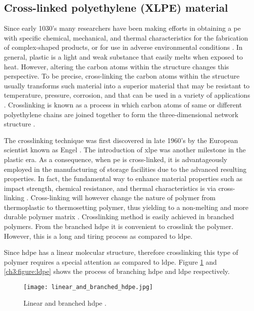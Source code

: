 \subsection{Cross-linked polyethylene (XLPE) material}

Since early 1030's many researchers have been making efforts in obtaining a \acrshort{pe} with specific chemical, mechanical, and thermal characteristics for the fabrication of complex-shaped products, or for use in adverse environmental conditions \cite{kurtz2009cross}. In general, plastic is a light and weak substance that easily melts when exposed to heat. However, altering the carbon atoms within the structure changes this perspective. To be precise, cross-linking the carbon atoms within the structure usually transforms such material into a superior material that may be resistant to temperature, pressure, corrosion, and that can be used in a variety of applications \cite{meola2005cross}. Crosslinking is known as a process in which carbon atoms of same or different polyethylene chains are joined together to form the three-dimensional network structure \cite{kurtz2009cross}.

The crosslinking technique was first discovered in late 1960's by the European scientist known as Engel \cite{meola2005cross}. The introduction of \acrfull{xlpe} was another milestone in the plastic era. As a consequence, when \acrshort{pe} is cross-linked, it is advantageously employed in the manufacturing of storage facilities due to the advanced resulting properties. In fact, the fundamental way to enhance material properties such as impact strength, chemical resistance, and thermal characteristics is via cross-linking \cite{andreopoulos1986mechanical}. Cross-linking will however change the nature of polymer from thermoplastic to thermosetting polymer, thus yielding to a non-melting and more durable polymer matrix \cite{clemens2017microstructure}. Crosslinking method is easily achieved in branched polymers. From the branched \acrshort{hdpe} it is convenient to crosslink the polymer. However, this is a long and tiring process as compared to \acrshort{ldpe}.

Since \acrshort{hdpe} has a linear molecular structure, therefore crosslinking this type of polymer requires a special attention as compared to \acrshort{ldpe}. Figure \ref{ch3:figure:hdpe} and \ref{ch3:figure:ldpe} shows the process of branching \acrshort{hdpe} and \acrshort{ldpe} respectively.
 
\begin{figure}[H]
    \centering
    \texttt{[image: linear\_and\_branched\_hdpe.jpg]}
    \caption{Linear and branched \acrshort{hdpe} \cite{gabriel1998history}.}
    \label{ch3:figure:hdpe}
\end{figure}

